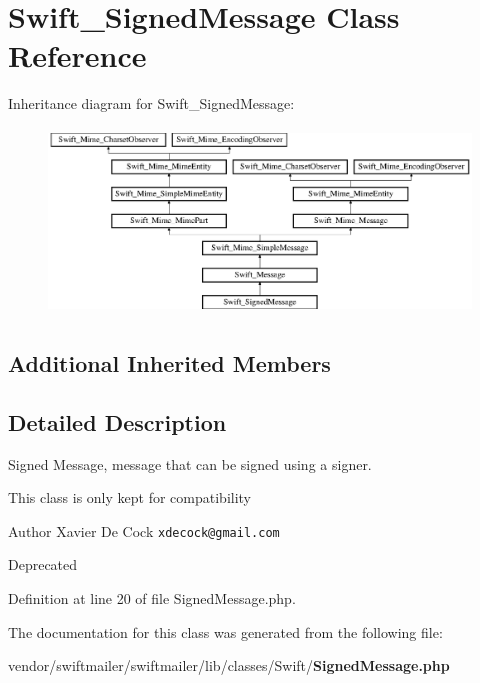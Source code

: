 \section{Swift\+\_\+\+Signed\+Message Class Reference}
\label{class_swift___signed_message}
Inheritance diagram for Swift\+\_\+\+Signed\+Message\+:\begin{figure}[H]
\begin{center}
\leavevmode
\includegraphics[height=4.949495cm]{class_swift___signed_message}
\end{center}
\end{figure}
\subsection*{Additional Inherited Members}


\subsection{Detailed Description}
Signed Message, message that can be signed using a signer.

This class is only kept for compatibility

\begin{DoxyAuthor}{Author}
Xavier De Cock {\tt xdecock@gmail.\+com} 
\end{DoxyAuthor}
\begin{DoxyRefDesc}{Deprecated}
\item[{\bf Deprecated}]\end{DoxyRefDesc}


Definition at line 20 of file Signed\+Message.\+php.



The documentation for this class was generated from the following file\+:\begin{DoxyCompactItemize}
\item 
vendor/swiftmailer/swiftmailer/lib/classes/\+Swift/{\bf Signed\+Message.\+php}\end{DoxyCompactItemize}
